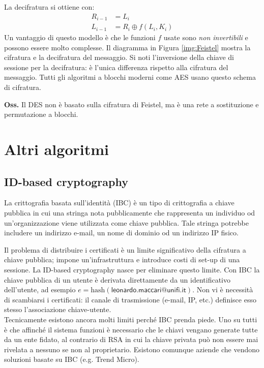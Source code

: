 La decifratura si ottiene con:
\begin{align*}
	R_{i-1} &= L_i \\
	L_{i-1} &= R_i \oplus f(L_i, K_i)
\end{align*}
Un vantaggio di questo modello è che le funzioni $f$ usate sono \textit{non invertibili} e possono essere molto complesse. Il diagramma in Figura \ref{img:Feistel} mostra la cifratura e la decifratura del messaggio. Si noti l'inversione della chiave di sessione per la decifratura: è l'unica differenza rispetto alla cifratura del messaggio. Tutti gli algoritmi a blocchi moderni come AES usano questo schema di cifratura. 

\textbf{Oss.} Il DES non è basato sulla cifratura di Feistel, ma è una rete a sostituzione e permutazione a blocchi.

\section{Altri algoritmi}

\subsection{ID-based cryptography}
La crittografia basata sull'identità (IBC) è un tipo di crittografia a chiave pubblica in cui una stringa nota pubblicamente che rappresenta un individuo od un'organizzazione viene utilizzata come chiave pubblica. Tale stringa potrebbe includere un indirizzo e-mail, un nome di dominio od un indirizzo IP fisico.

Il problema di distribuire i certificati è un limite significativo della cifratura a chiave pubblica; impone un'infrastruttura e introduce costi di set-up di una sessione. La ID-based cryptography nasce per eliminare questo limite. Con IBC la chiave pubblica di un utente è derivata direttamente da un identificativo dell'utente, ad esempio $e=\text{hash}(\textsf{leonardo.maccari@unifi.it})$. Non vi è necessità di scambiarsi i certificati: il canale di trasmissione (e-mail, IP, etc.) definisce esso stesso l'associazione chiave-utente.\\
Tecnicamente esistono ancora molti limiti perché IBC prenda piede. Uno su tutti è che affinché il sistema funzioni è necessario che le chiavi vengano generate tutte da un ente fidato, al contrario di RSA in cui la chiave privata può non essere mai rivelata a nessuno se non al proprietario. Esistono comunque aziende che vendono soluzioni basate su IBC (e.g. Trend Micro).

